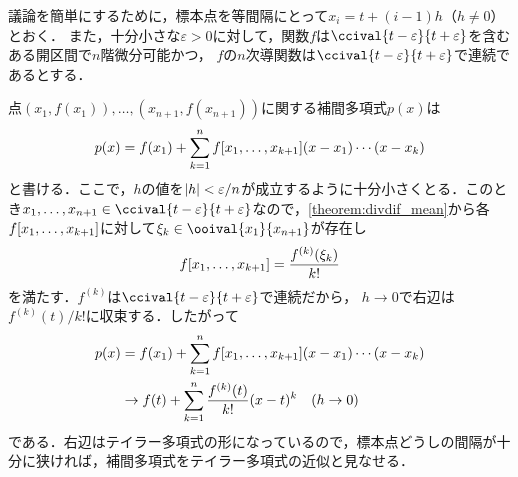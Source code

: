 \documentclass[../../numcalc]{subfiles}
\begin{document}
議論を簡単にするために，標本点を等間隔にとって\(x_i=t+(i-1)h\)（\(h\neq 0\)）とおく．
また，十分小さな\(\varepsilon>0\)に対して，関数\(f\)は\(\ccival{t-\varepsilon}{t+\varepsilon}\)を含むある開区間で\(n\)階微分可能かつ，
\(f\)の\(n\)次導関数は\(\ccival{t-\varepsilon}{t+\varepsilon}\)で連続であるとする．

点\((x_1,f(x_1)),\dots,(x_{n+1},f(x_{n+1}))\)に関する補間多項式\(p(x)\)は
\[
  p(x) = f(x_1)+\sum_{k=1}^n\divdiff[f]{x_1,\dots,x_{k+1}}(x-x_1)\dotsm(x-x_k)
\]
と書ける．ここで，\(h\)の値を\(\abs{h}<\varepsilon/n\)が成立するように十分小さくとる．このとき\(x_1,\dots,x_{n+1}\in\ccival{t-\varepsilon}{t+\varepsilon}\)なので，\cref{theorem:divdif_mean}から各\(\divdiff[f]{x_1,\dots,x_{k+1}}\)に対して\(\xi_k\in\ooival{x_1}{x_{n+1}}\)が存在し
\[
  \divdiff[f]{x_1,\dots,x_{k+1}} = \frac{f^{(k)}(\xi_k)}{k!}
\]
を満たす．\(f^{(k)}\)は\(\ccival{t-\varepsilon}{t+\varepsilon}\)で連続だから，
\(h\to 0\)で右辺は\(f^{(k)}(t)/k!\)に収束する．したがって
\begin{align}
  \label{equation:newton_taylor}
  p(x) &=f(x_1)+\sum_{k=1}^n\divdiff[f]{x_1,\dots,x_{k+1}}(x-x_1)\dotsm (x-x_k) \\
  &\to f(t)+\sum_{k=1}^n\frac{f^{(k)}(t)}{k!}(x-t)^k\quad(h\to 0)
\end{align}
である．右辺はテイラー多項式の形になっているので，標本点どうしの間隔が十分に狭ければ，補間多項式をテイラー多項式の近似と見なせる．
\end{document}
